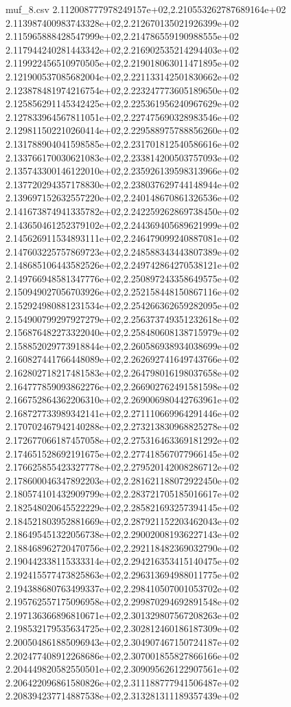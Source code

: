 \begin{filecontents*}{muf_8.csv}
2.112008777978249157e+02,2.210553262787689164e+02
2.113987400983743328e+02,2.212670135021926399e+02
2.115965888428547999e+02,2.214786559190988555e+02
2.117944240281443342e+02,2.216902535214294403e+02
2.119922456510970505e+02,2.219018063011471895e+02
2.121900537085682004e+02,2.221133142501830662e+02
2.123878481974216754e+02,2.223247773605189650e+02
2.125856291145342425e+02,2.225361956240967629e+02
2.127833964567811051e+02,2.227475690328983546e+02
2.129811502210260414e+02,2.229588975788856260e+02
2.131788904041598585e+02,2.231701812540586616e+02
2.133766170030621083e+02,2.233814200503757093e+02
2.135743300146122010e+02,2.235926139598313966e+02
2.137720294357178830e+02,2.238037629744148944e+02
2.139697152632557220e+02,2.240148670861326536e+02
2.141673874941335782e+02,2.242259262869738450e+02
2.143650461252379102e+02,2.244369405689621999e+02
2.145626911534893111e+02,2.246479099240887081e+02
2.147603225757869723e+02,2.248588343443807389e+02
2.148685106443582526e+02,2.249742864270538121e+02
2.149766948581347776e+02,2.250897243358649575e+02
2.150949027056703926e+02,2.252158448150867116e+02
2.152924980881231534e+02,2.254266362659282095e+02
2.154900799297927279e+02,2.256373749351232618e+02
2.156876482273322040e+02,2.258480608138715979e+02
2.158852029773918844e+02,2.260586938934038699e+02
2.160827441766448089e+02,2.262692741649743766e+02
2.162802718217481583e+02,2.264798016198037658e+02
2.164777859093862276e+02,2.266902762491581598e+02
2.166752864362206310e+02,2.269006980442763961e+02
2.168727733989342141e+02,2.271110669964291446e+02
2.170702467942140288e+02,2.273213830968825278e+02
2.172677066187457058e+02,2.275316463369181292e+02
2.174651528692191675e+02,2.277418567077966145e+02
2.176625855423327778e+02,2.279520142008286712e+02
2.178600046347892203e+02,2.281621188072922450e+02
2.180574101432909799e+02,2.283721705185016617e+02
2.182548020645522229e+02,2.285821693257394145e+02
2.184521803952881669e+02,2.287921152203462043e+02
2.186495451322056738e+02,2.290020081936227143e+02
2.188468962720470756e+02,2.292118482369032790e+02
2.190442338115333314e+02,2.294216353415140475e+02
2.192415577473825863e+02,2.296313694988011775e+02
2.194388680763499337e+02,2.298410507001053702e+02
2.195762557175096958e+02,2.299870294692891548e+02
2.197136366896810671e+02,2.301329807567208263e+02
2.198532179535634725e+02,2.302812460186187309e+02
2.200504861885096943e+02,2.304907467150724187e+02
2.202477408912268686e+02,2.307001855827866166e+02
2.204449820582550501e+02,2.309095626122907561e+02
2.206422096861580826e+02,2.311188777941506487e+02
2.208394237714887538e+02,2.313281311189357439e+02

\end{filecontents*}
